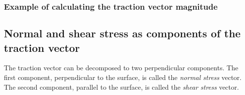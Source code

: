 \subsubsection{Example of calculating the traction vector magnitude}

\cdots

\subsection{Normal and shear stress as components of the traction vector}

The traction vector can be decomposed to two perpendicular components. The first component, perpendicular to the surface, is called the \textit{normal stress} vector. The second component, parallel to the surface, is called the \textit{shear stress} vector.
